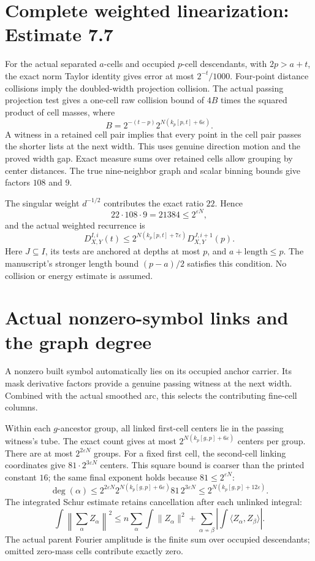 \documentclass[11pt]{article}
\begin{document}
\newpage
\section*{Complete weighted linearization: Estimate 7.7}
For the actual separated $a$-cells and occupied $p$-cell descendants, with
$2p>a+t$, the exact norm Taylor identity gives error at most $2^{-t}/1000$.
Four-point distance collisions imply the doubled-width projection collision.
The actual passing projection test gives a one-cell raw collision bound of
$4B$ times the squared product of cell masses, where
\[
B=2^{-(t-p)}2^{N(k_p[p,t]+6\varepsilon)}.
\]
A witness in a retained cell pair implies that every point in the cell pair
passes the shorter lists at the next width. This uses genuine direction motion
and the proved width gap. Exact measure sums over retained cells allow grouping
by center distances. The true nine-neighbor graph and scalar binning bounds
give factors $108$ and $9$.

The singular weight $d^{-1/2}$ contributes the exact ratio $22$. Hence
\[
22\cdot108\cdot9=21384\le2^{\varepsilon N},
\]
and the actual weighted recurrence is
\[
D_{X,Y}^{I,i}(t)\le2^{N(k_p[p,t]+7\varepsilon)}D_{X,Y}^{J,i+1}(p).
\]
Here $J\subseteq I$, its tests are anchored at depths at most $p$, and
$a+\mathrm{length}\le p$. The manuscript's stronger length bound $(p-a)/2$
satisfies this condition. No collision or energy estimate is assumed.

\newpage
\section*{Actual nonzero-symbol links and the graph degree}
A nonzero built symbol automatically lies on its occupied anchor carrier.
Its mask derivative factors provide a genuine passing witness at the next
width. Combined with the actual smoothed arc, this selects the contributing
fine-cell columns.

Within each $g$-ancestor group, all linked first-cell centers lie in the passing
witness's tube. The exact count gives at most $2^{N(k_p[g,p]+6\varepsilon)}$
centers per group. There are at most $2^{2\varepsilon N}$ groups. For a fixed
first cell, the second-cell linking coordinates give $81\cdot2^{3\varepsilon N}$
centers. This square bound is coarser than the printed constant $16$; the
same final exponent holds because $81\le2^{\varepsilon N}$:
\[
\deg(\alpha)\le2^{2\varepsilon N}2^{N(k_p[g,p]+6\varepsilon)}
81\,2^{3\varepsilon N}\le2^{N(k_p[g,p]+12\varepsilon)}.
\]
The integrated Schur estimate retains cancellation after each unlinked integral:
\[
\int\left\|\sum_\alpha Z_\alpha\right\|^2\le
n\sum_\alpha\int\|Z_\alpha\|^2+
\sum_{\alpha\not\sim\beta}
\left|\int\langle Z_\alpha,Z_\beta\rangle\right|.
\]
The actual parent Fourier amplitude is the finite sum over occupied descendants;
omitted zero-mass cells contribute exactly zero.
\end{document}
